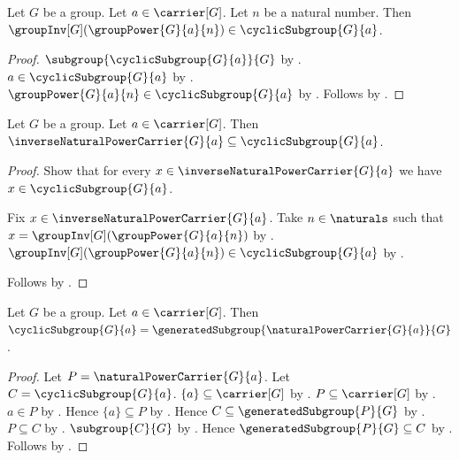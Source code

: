 \begin{proposition}\label{inverse_group_power_in_cyclic_subgroup}
    Let $G$ be a group.
    Let $a\in\carrier[G]$.
    Let $n$ be a natural number.
    Then
        $\groupInv[G](\groupPower{G}{a}{n})
            \in\cyclicSubgroup{G}{a}$.
\end{proposition}
\begin{proof}
    $\subgroup{\cyclicSubgroup{G}{a}}{G}$ by
        .
    $a\in\cyclicSubgroup{G}{a}$ by
        .
    $\groupPower{G}{a}{n}\in\cyclicSubgroup{G}{a}$ by
        .
    Follows by .
\end{proof}

\begin{theorem}\label{inverse_natural_power_carrier_subseteq_cyclic_subgroup}
    Let $G$ be a group.
    Let $a\in\carrier[G]$.
    Then
        $\inverseNaturalPowerCarrier{G}{a}\subseteq
            \cyclicSubgroup{G}{a}$.
\end{theorem}
\begin{proof}
    Show that for every $x\in\inverseNaturalPowerCarrier{G}{a}$
        we have $x\in\cyclicSubgroup{G}{a}$.
    \begin{subproof}
        Fix $x\in\inverseNaturalPowerCarrier{G}{a}$.
        Take $n\in\naturals$ such that
            $x=\groupInv[G](\groupPower{G}{a}{n})$ by
            .
        $\groupInv[G](\groupPower{G}{a}{n})
            \in\cyclicSubgroup{G}{a}$ by
            .
    \end{subproof}
    Follows by .
\end{proof}

\begin{theorem}\label{cyclic_subgroup_generated_by_natural_powers}
    Let $G$ be a group.
    Let $a\in\carrier[G]$.
    Then
        $\cyclicSubgroup{G}{a}=
            \generatedSubgroup{\naturalPowerCarrier{G}{a}}{G}$.
\end{theorem}
\begin{proof}
    Let $P=\naturalPowerCarrier{G}{a}$.
    Let $C=\cyclicSubgroup{G}{a}$.
    $\{a\}\subseteq\carrier[G]$ by
        .
    $P\subseteq\carrier[G]$ by
        .
    $a\in P$ by
        .
    Hence $\{a\}\subseteq P$ by .
    Hence $C\subseteq\generatedSubgroup{P}{G}$ by
        .
    $P\subseteq C$ by
        .
    $\subgroup{C}{G}$ by
        .
    Hence $\generatedSubgroup{P}{G}\subseteq C$ by
        .
    Follows by .
\end{proof}

